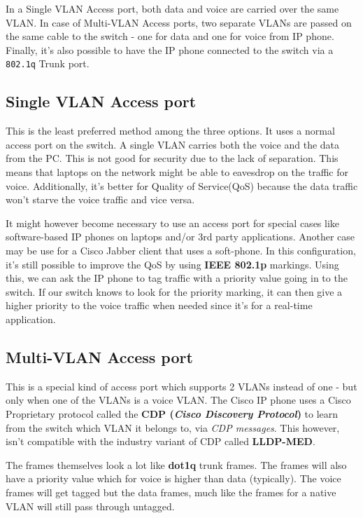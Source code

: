 \noindent
In a Single VLAN Access port, both data and voice are carried over the same VLAN. In case of Multi-VLAN Access ports, two separate VLANs are passed on the same cable to the switch - one for data and one for voice from IP phone. Finally, it's also possible to have the IP phone connected to the switch via a \verb|802.1q| Trunk port. 

\subsection{Single VLAN Access port}
This is the least preferred method among the three options. It uses a normal access port on the switch. A single VLAN carries both the voice and the data from the PC. This is not good for security due to the lack of separation. This means that laptops on the network might be able to eavesdrop on the traffic for voice. Additionally, it's better for Quality of Service(QoS) because the data traffic won't starve the voice traffic and vice versa. 

It might however become necessary to use an access port for special cases like software-based IP phones on laptops and/or 3rd party applications. Another case may be use for a Cisco Jabber client that uses a soft-phone. In this configuration, it's still possible to improve the QoS by using \textbf{IEEE 802.1p} markings. Using this, we can ask the IP phone to tag traffic with a priority value going in to the switch. If our switch knows to look for the priority marking, it can then give a higher priority to the voice traffic when needed since it's for a real-time application. 

\subsection{Multi-VLAN Access port}
This is a special kind of access port which supports 2 VLANs instead of one - but only when one of the VLANs is a voice VLAN. The Cisco IP phone uses a Cisco Proprietary protocol called the \textbf{CDP (\textit{Cisco Discovery Protocol})} to learn from the switch which VLAN it belongs to, via \textit{CDP messages}. This however, isn't compatible with the industry variant of CDP called \textbf{LLDP-MED}. 

The frames themselves look a lot like \textbf{dot1q} trunk frames. The frames will also have a priority value which for voice is higher than data (typically). The voice frames will get tagged but the data frames, much like the frames for a native VLAN  will still pass through untagged. 

